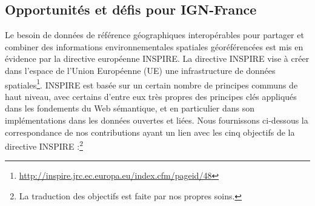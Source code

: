 \documentclass[a4paper,11pt,twoside]{report}
\begin{document}
\subsection*{Opportunités et défis pour IGN-France}
\label{sec:challenges}
Le besoin de données de référence géographiques interopérables pour partager et combiner des informations environnementales spatiales géoréférencées est mis en évidence par la directive européenne INSPIRE. La directive INSPIRE vise à créer dans l'espace de l'Union Européenne (UE) une infrastructure de données spatiales\footnote{\url{http://inspire.jrc.ec.europa.eu/index.cfm/pageid/48}}. INSPIRE est basée sur un certain nombre de principes communs de haut niveau, avec certains d'entre eux très propres des principes clés appliqués dans les fondements du Web sémantique, et en particulier dans son implémentations dans les données ouvertes et liées. Nous fournissons ci-dessous la correspondance de nos contributions ayant un lien avec les cinq objectifs de la directive INSPIRE :\footnote{La traduction des objectifs est faite par nos propres soins.}
\end{document}
